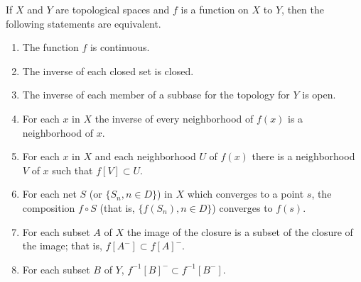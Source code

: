 If $X$ and $Y$ are topological spaces and $f$ is a function on $X$ to $Y$, then the following statements are equivalent.
\begin{enumerate}
\item[(a)] The function $f$ is continuous.
\item[(b)] The inverse of each closed set is closed.
\item[(c)] The inverse of each member of a subbase for the topology for $Y$ is open.
\item[(d)] For each $x$ in $X$ the inverse of every neighborhood of $f(x)$ is a neighborhood of $x$.
\item[(e)] For each $x$ in $X$ and each neighborhood $U$ of $f(x)$ there is a neighborhood $V$ of $x$ such that $f[V] \subset U$.
\item[(f)] For each net $S$ (or $\{S_n, n \in D\}$) in $X$ which converges to a point $s$, the composition $f \circ S$ (that is, $\{f(S_n), n \in D\}$) converges to $f(s)$.
\item[(g)] For each subset $A$ of $X$ the image of the closure is a subset of the closure of the image; that is, $f[A^{-}] \subset f[A]^{-}$.
\item[(h)] For each subset $B$ of $Y$, $f^{-1}[B]^{-} \subset f^{-1}[B^{-}]$.
\end{enumerate}
